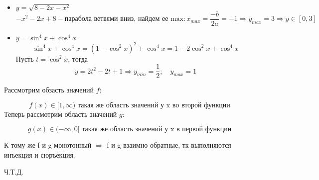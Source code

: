 \documentclass{report}
\begin{document}

\sol 
\begin{center}
\begin{itemize}
\item $y=\sqrt{8-2 x-x^{2}}$\\
\begin{equation}
	-x^2-2x+8 - \text{парабола ветвями вниз, найдем ее max}: x_{max}=\frac{-b}{2a}=-1 \Rightarrow y_{max}=3 \Rightarrow y \in [0, 3]
\end{equation}
\item $y=\sin ^{4} x+\cos ^{4} x$\\
\begin{equation}
\sin ^{4} x+\cos ^{4} x =(1-\cos^2 x)^2 +\cos^4 x = 1-2\cos^2 x+\cos^4 x 
\end{equation}
Пусть $t=\cos^2 x$, тогда
\begin{equation}
	y=2t^2-2t+1 \Rightarrow y_{min}=\frac{1}{2}; \quad y_{max}=1
\end{equation}
\end{itemize}
\end{center}




\sol Рассмотрим обзасть значений $f$:

\begin{equation}
	f(x) \in [1, \infty) \text{ такая же область значений у x во второй функции}
\end{equation}
Теперь рассмотрим область значений $g$:

\begin{equation}
	g(x) \in (-\infty, 0] \text{ такая же область значений у x в первой функции}
\end{equation}

К тому же f и g монотонный $\Rightarrow$ f и g взаимно обратные, тк выполняются инъекция и сюръекция.\\
\begin{center}
	Ч.Т.Д.
\end{center}
\end{document}
